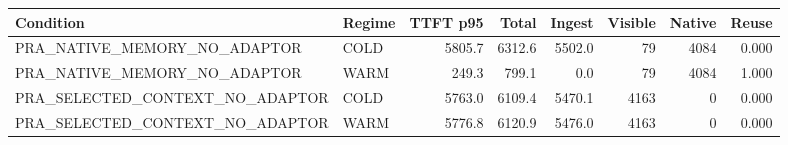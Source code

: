 \begin{tabular}{llrrrrrr}
\toprule
Condition & Regime & TTFT p95 & Total & Ingest & Visible & Native & Reuse \\
\midrule
PRA\_NATIVE\_MEMORY\_NO\_ADAPTOR & COLD & 5805.7 & 6312.6 & 5502.0 & 79 & 4084 & 0.000 \\
PRA\_NATIVE\_MEMORY\_NO\_ADAPTOR & WARM & 249.3 & 799.1 & 0.0 & 79 & 4084 & 1.000 \\
PRA\_SELECTED\_CONTEXT\_NO\_ADAPTOR & COLD & 5763.0 & 6109.4 & 5470.1 & 4163 & 0 & 0.000 \\
PRA\_SELECTED\_CONTEXT\_NO\_ADAPTOR & WARM & 5776.8 & 6120.9 & 5476.0 & 4163 & 0 & 0.000 \\
\bottomrule
\end{tabular}
